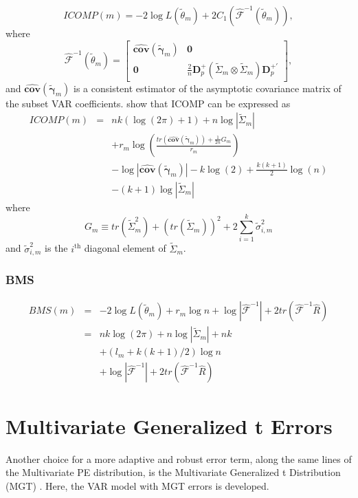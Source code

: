 \[
ICOMP\left(m\right)=-2\log L\left(\widetilde{\theta}_{m}\right)+2C_{1}\left(\hat{\mathcal{F}}^{-1}\left(\widetilde{\theta}_{m}\right)\right),
\]
where
\[
\hat{\mathcal{F}}^{-1}\left(\widetilde{\theta}_{m}\right)=\left[\begin{array}{cc}
\widehat{\mathbf{cov}}\left(\widetilde{\mathbf{\gamma}}_{m}\right) & \mathbf{0}\\
\mathbf{0} & \frac{2}{n}\mathbf{D}_{p}^{+}\left(\widetilde{\Sigma}_{m}\otimes\widetilde{\Sigma}_{m}\right)\mathbf{D}_{p}^{+\prime}
\end{array}\right],
\]
and $\widehat{\mathbf{cov}}\left(\widetilde{\mathbf{\gamma}}_{m}\right)$
is a consistent estimator of the asymptotic covariance matrix of the
subset VAR coefficients. \citet{Bea:Boz:1998} show that ICOMP can
be expressed as
\begin{eqnarray*}
ICOMP\left(m\right) & = & nk\left(\log\left(2\pi\right)+1\right)+n\log\left\vert \widetilde{\Sigma}_{m}\right\vert \\
 &  & +r_{m}\log\left(\frac{tr\left(\widehat{\mathbf{cov}}\left(\widetilde{\mathbf{\gamma}}_{m}\right)\right)+\frac{1}{2n}G_{m}}{r_{m}}\right)\\
 &  & -\log\left\vert \widehat{\mathbf{cov}}\left(\widetilde{\mathbf{\gamma}}_{m}\right)\right\vert -k\log\left(2\right)+\frac{k\left(k+1\right)}{2}\log\left(n\right)\\
 &  & -\left(k+1\right)\log\left\vert \widetilde{\Sigma}_{m}\right\vert 
\end{eqnarray*}
where
\[
G_{m}\equiv tr\left(\widetilde{\Sigma}_{m}^{2}\right)+\left(tr\left(\widetilde{\Sigma}_{m}\right)\right)^{2}+2\sum_{i=1}^{k}\widetilde{\sigma}_{i,m}^{2}
\]
and $\widetilde{\sigma}_{i,m}^{2}$ is the $i^{\text{th}}$ diagonal
element of $\widetilde{\Sigma}_{m}$.


\subsubsection{BMS}

\begin{eqnarray*}
BMS\left(m\right) & = & -2\log L\left(\widetilde{\theta}_{m}\right)+r_{m}\log n+\log\left\vert \hat{\mathcal{F}}^{-1}\right\vert +2tr\left(\hat{\mathcal{F}}^{-1}\hat{R}\right)\\
 & = & nk\log\left(2\pi\right)+n\log\left\vert \widetilde{\Sigma}_{m}\right\vert +nk\\
 &  & +\left(l_{m}+k\left(k+1\right)/2\right)\log n\\
 &  & +\log\left\vert \hat{\mathcal{F}}^{-1}\right\vert +2tr\left(\hat{\mathcal{F}}^{-1}\hat{R}\right)
\end{eqnarray*}



\section{Multivariate Generalized t Errors}

Another choice for a more adaptive and robust error term, along the
same lines of the Multivariate PE distribution, is the Multivariate
Generalized t Distribution (MGT) \citet{Arsl:2004}. Here, the VAR
model with MGT errors is developed.
